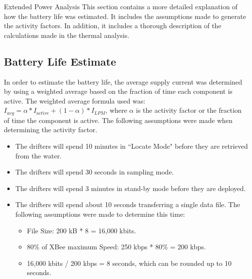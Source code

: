 \begin{customAppendixPage}{Extended Power Analysis}
\label{sec:extendedPowerAnalysis}
This section contains a more detailed explanation of how the battery life was estimated.  It includes the assumptions made to generate the activity factors.  In addition, it includes a thorough description of the calculations made in the thermal analysis.

\end{customAppendixPage}
\renewcommand*{\thepage}{\thesection-\arabic{page}}

\subsection{Battery Life Estimate}
In order to estimate the battery life, the average supply current was determined by using a weighted average based on the fraction of time each component is active.  The weighted average formula used was: $I_{avg} = \alpha * I_{active} + (1 - \alpha) * I_{LPM}$, where $\alpha$ is the activity factor or the fraction of time the component is active.  The following assumptions were made when determining the activity factor.

\begin{itemize}
\item The drifters will spend 10 minutes in ``Locate Mode" before they are retrieved from the water.
\item The drifters will spend 30 seconds in sampling mode.
\item The drifters will spend 3 minutes in stand-by mode before they are deployed.
\item The drifters will spend about 10 seconds transferring a single data file.  The following assumptions were made to determine this time:
	\begin{itemize}
		\item File Size: 200 kB * 8 = 16,000 kbits.
		\item 80\% of XBee maximum Speed: 250 kbps * 80\% = 200 kbps.
		\item 16,000 kbits / 200 kbps = 8 seconds, which can be rounded up to 10 seconds.
	\end{itemize}
\end{itemize}


